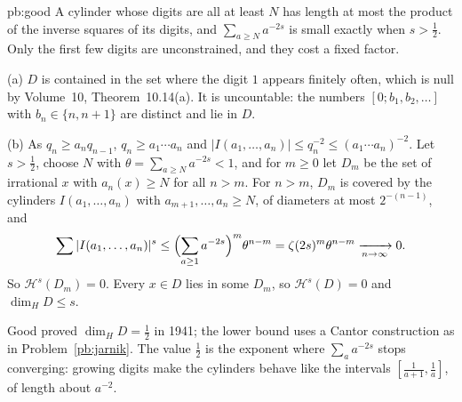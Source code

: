 \begin{solution}{pb:good}
\idea A cylinder whose digits are all at least $N$ has length at most the product of the inverse squares of its digits, and $\sum_{a\ge N}a^{-2s}$ is small exactly
when $s>\frac12$. Only the first few digits are unconstrained, and they cost a fixed factor.

\writeup (a) $D$ is contained in the set where the digit $1$ appears finitely often, which is null by Volume~10, Theorem~10.14(a). It is uncountable: the numbers
$[0;b_1,b_2,\dots]$ with $b_n\in\{n,n+1\}$ are distinct and lie in $D$.

(b) As $q_n\ge a_nq_{n-1}$, $q_n\ge a_1\cdots a_n$ and $|I(a_1,\dots,a_n)|\le q_n^{-2}\le(a_1\cdots a_n)^{-2}$. Let $s>\frac12$, choose $N$ with
$\theta=\sum_{a\ge N}a^{-2s}<1$, and for $m\ge0$ let $D_m$ be the set of irrational $x$ with $a_n(x)\ge N$ for all $n>m$. For $n>m$, $D_m$ is covered by the cylinders
$I(a_1,\dots,a_n)$ with $a_{m+1},\dots,a_n\ge N$, of diameters at most $2^{-(n-1)}$, and
\[
\sum|I(a_1,\dots,a_n)|^s\le\Bigl(\sum_{a\ge1}a^{-2s}\Bigr)^m\theta^{n-m}=\zeta(2s)^m\theta^{n-m}\xrightarrow[n\to\infty]{}0.
\]
So $\mathcal H^s(D_m)=0$. Every $x\in D$ lies in some $D_m$, so $\mathcal H^s(D)=0$ and $\dim_HD\le s$.

\leads Good proved $\dim_HD=\frac12$ in 1941; the lower bound uses a Cantor construction as in Problem~\ref{pb:jarnik}. The value $\frac12$ is the exponent where
$\sum_aa^{-2s}$ stops converging: growing digits make the cylinders behave like the intervals $[\frac1{a+1},\frac1a]$, of length about $a^{-2}$.
\end{solution}

